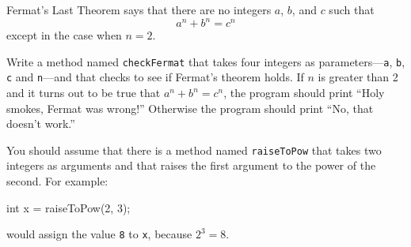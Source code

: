 \begin{exercise}
Fermat's Last Theorem says that there are no integers
$a$, $b$, and $c$ such that
%
\[ a^n + b^n = c^n \]
%
except in the case when $n=2$.

Write a method named {\tt checkFermat} that takes four
integers as parameters---{\tt a}, {\tt b}, {\tt c} and {\tt n}---and
that checks to see if Fermat's theorem holds.  If
$n$ is greater than 2 and it turns out to be true that
$a^n + b^n = c^n$,
the program should print ``Holy smokes, Fermat was wrong!''
Otherwise the program should print ``No, that doesn't work.''

You should assume that there is a method named {\tt raiseToPow}
that takes two integers as arguments and that raises the
first argument to the power of the second.  For example:

\begin{code}
    int x = raiseToPow(2, 3);
\end{code}
%
would assign the value {\tt 8} to {\tt x}, because $2^3 = 8$.

\end{exercise}


